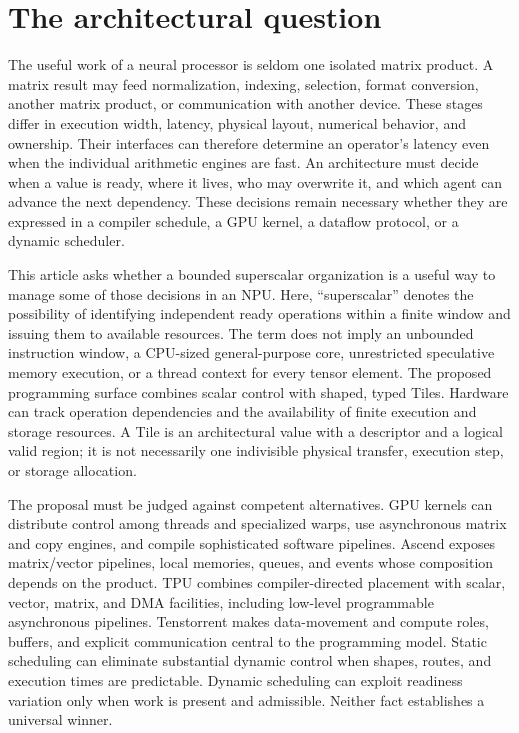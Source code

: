 \section{The architectural question}
\label{sec:introduction}

The useful work of a neural processor is seldom one isolated matrix product. A matrix result may feed normalization, indexing, selection, format conversion, another matrix product, or communication with another device. These stages differ in execution width, latency, physical layout, numerical behavior, and ownership. Their interfaces can therefore determine an operator's latency even when the individual arithmetic engines are fast. An architecture must decide when a value is ready, where it lives, who may overwrite it, and which agent can advance the next dependency. These decisions remain necessary whether they are expressed in a compiler schedule, a GPU kernel, a dataflow protocol, or a dynamic scheduler.

This article asks whether a bounded superscalar organization is a useful way to manage some of those decisions in an NPU. Here, ``superscalar'' denotes the possibility of identifying independent ready operations within a finite window and issuing them to available resources. The term does not imply an unbounded instruction window, a CPU-sized general-purpose core, unrestricted speculative memory execution, or a thread context for every tensor element. The proposed programming surface combines scalar control with shaped, typed Tiles. Hardware can track operation dependencies and the availability of finite execution and storage resources. A Tile is an architectural value with a descriptor and a logical valid region; it is not necessarily one indivisible physical transfer, execution step, or storage allocation.

The proposal must be judged against competent alternatives. GPU kernels can distribute control among threads and specialized warps, use asynchronous matrix and copy engines, and compile sophisticated software pipelines. Ascend exposes matrix/vector pipelines, local memories, queues, and events whose composition depends on the product. TPU combines compiler-directed placement with scalar, vector, matrix, and DMA facilities, including low-level programmable asynchronous pipelines. Tenstorrent makes data-movement and compute roles, buffers, and explicit communication central to the programming model. Static scheduling can eliminate substantial dynamic control when shapes, routes, and execution times are predictable. Dynamic scheduling can exploit readiness variation only when work is present and admissible. Neither fact establishes a universal winner.

